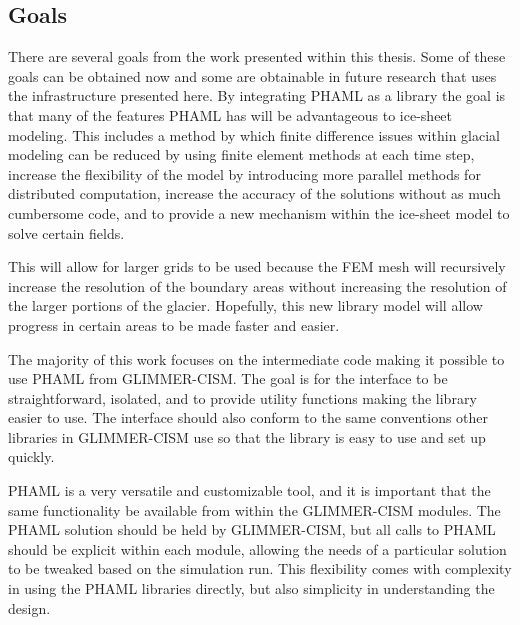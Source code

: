 
\subsection{Goals}\label{sec:chp1goal}

There are several goals from the work presented within this thesis.  Some of these goals can be obtained now and some are obtainable in future research that uses the infrastructure presented here.  By integrating PHAML as a library the goal is that many of the features PHAML has will be advantageous to ice-sheet modeling.  This includes a method by which finite difference issues within glacial modeling can be reduced by using finite element methods at each time step, increase the flexibility of the model by introducing more parallel methods for distributed computation, increase the accuracy of the solutions without as much cumbersome code, and to provide a new mechanism within the ice-sheet model to solve certain fields. 

This will allow for larger grids to be used because the FEM mesh will recursively increase the resolution of the boundary areas without increasing the resolution of the larger portions of the glacier.  Hopefully, this new library model will allow progress in certain areas to be made faster and easier.

The majority of this work focuses on the intermediate code making it possible to use PHAML from GLIMMER-CISM.  The goal is for the interface to be straightforward, isolated, and to provide utility functions making the library easier to use.  The interface should also conform to the same conventions other libraries in GLIMMER-CISM use so that the library is easy to use and set up quickly.

PHAML is a very versatile and customizable tool, and it is important that the same functionality be available from within the GLIMMER-CISM modules.  The PHAML solution should be held by GLIMMER-CISM, but all calls to PHAML should be explicit within each module, allowing the needs of a particular solution to be tweaked based on the simulation run.  This flexibility comes with complexity in using the PHAML libraries directly, but also simplicity in understanding the design.


